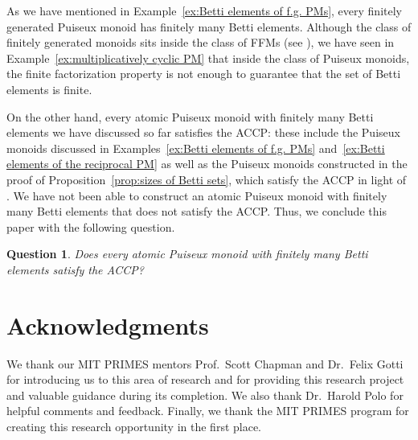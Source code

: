 \documentclass[12pt]{amsart}
\newtheorem{question}[theorem]{Question}
\theoremstyle{definition}
\numberwithin{equation}{section}
\begin{document}
As we have mentioned in Example~\ref{ex:Betti elements of f.g. PMs}, every finitely generated Puiseux monoid has finitely many Betti elements. Although the class of finitely generated monoids sits inside the class of FFMs (see \cite[Proposition~2.7.8]{GH06}), we have seen in Example~\ref{ex:multiplicatively cyclic PM} that inside the class of Puiseux monoids, the finite factorization property is not enough to guarantee that the set of Betti elements is finite.

On the other hand, every atomic Puiseux monoid with finitely many Betti elements we have discussed so far satisfies the ACCP: these include the Puiseux monoids discussed in Examples~\ref{ex:Betti elements of f.g. PMs} and~\ref{ex:Betti elements of the reciprocal PM} as well as the Puiseux monoids constructed in the proof of Proposition~\ref{prop:sizes of Betti sets}, which satisfy the ACCP in light of \cite[Theorem~4.5]{AGH21}. We have not been able to construct an atomic Puiseux monoid with finitely many Betti elements that does not satisfy the ACCP. Thus, we conclude this paper with the following question.

\begin{question}
	Does every atomic Puiseux monoid with finitely many Betti elements satisfy the ACCP?
\end{question}












\bigskip
\section*{Acknowledgments}

We thank our MIT PRIMES mentors Prof.\ Scott Chapman and Dr.\ Felix Gotti for introducing us to this area of research and for providing this research project  and valuable guidance during its completion. We also thank Dr.\ Harold Polo for helpful comments and feedback. Finally, we thank the MIT PRIMES program for creating this research opportunity in the first place.
\end{document}
